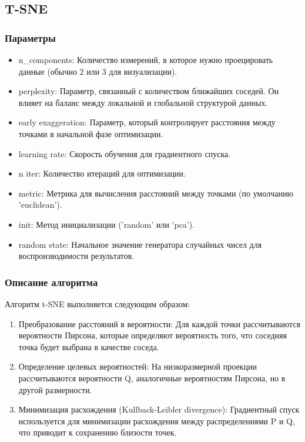 	\subsection{T-SNE}
	
		\subsubsection{Параметры}
			\begin{itemize}
				\item n\_components: Количество измерений, в которое нужно проецировать данные (обычно 2 или 3 для визуализации).
				\item perplexity: Параметр, связанный с количеством ближайших соседей. Он влияет на баланс между локальной и глобальной структурой данных.
				\item early exaggeration: Параметр, который контролирует расстояния между точками в начальной фазе оптимизации.
				\item learning rate: Скорость обучения для градиентного спуска.
				\item n iter: Количество итераций для оптимизации.
				\item metric: Метрика для вычисления расстояний между точками (по умолчанию 'euclidean').
				\item init: Метод инициализации ('random' или 'pca').			
				\item random state: Начальное значение генератора случайных чисел для воспроизводимости результатов.
			\end{itemize}				
		
		\subsubsection{Описание алгоритма}
			Алгоритм t-SNE выполняется следующим образом:
			\begin{enumerate}
				\item Преобразование расстояний в вероятности: Для каждой точки рассчитываются вероятности Пирсона, которые определяют вероятность того, что соседняя точка будет выбрана в качестве соседа.
				\item Определение целевых вероятностей: На низкоразмерной проекции рассчитываются вероятности Q, аналогичные вероятностям Пирсона, но в другой размерности.
				\item  Минимизация расхождения (Kullback-Leibler divergence): Градиентный спуск используется для минимизации расхождения между распределениями P и Q, что приводит к сохранению близости точек.
			\end{enumerate}
			
